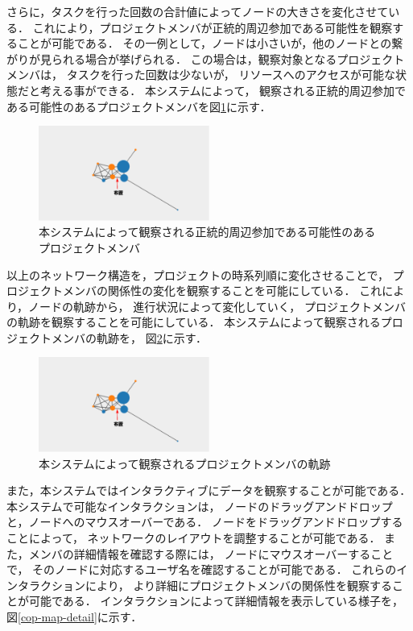 \documentclass[submit,techrep]{ipsj}
\begin{document}
さらに，タスクを行った回数の合計値によってノードの大きさを変化させている．
これにより，プロジェクトメンバが正統的周辺参加である可能性を観察することが可能である．
その一例として，ノードは小さいが，他のノードとの繋がりが見られる場合が挙げられる．
この場合は，観察対象となるプロジェクトメンバは，
タスクを行った回数は少ないが，
リソースへのアクセスが可能な状態だと考える事ができる．
本システムによって，
観察される正統的周辺参加である可能性のあるプロジェクトメンバを図\ref{cop-map-lpp}に示す．

\begin{figure}[h]
  \centering
  \includegraphics[width=0.5\textwidth]{img/cop-map-lpp.eps}
  \caption{本システムによって観察される正統的周辺参加である可能性のあるプロジェクトメンバ}
  \label{cop-map-lpp}
\end{figure}

以上のネットワーク構造を，プロジェクトの時系列順に変化させることで，
プロジェクトメンバの関係性の変化を観察することを可能にしている．
これにより，ノードの軌跡から，
進行状況によって変化していく，
プロジェクトメンバの軌跡を観察することを可能にしている．
本システムによって観察されるプロジェクトメンバの軌跡を，
図\ref{cop-map-trajectory}に示す．

\begin{figure}[h]
  \centering
  \includegraphics[width=0.5\textwidth]{img/cop-map-trajectory.eps}
  \caption{本システムによって観察されるプロジェクトメンバの軌跡}
  \label{cop-map-trajectory}
\end{figure}

また，本システムではインタラクティブにデータを観察することが可能である．
本システムで可能なインタラクションは，
ノードのドラッグアンドドロップと，ノードへのマウスオーバーである．
ノードをドラッグアンドドロップすることによって，
ネットワークのレイアウトを調整することが可能である．
また，メンバの詳細情報を確認する際には，
ノードにマウスオーバーすることで，
そのノードに対応するユーザ名を確認することが可能である．
これらのインタラクションにより，
より詳細にプロジェクトメンバの関係性を観察することが可能である．
インタラクションによって詳細情報を表示している様子を，
図\ref{cop-map-detail}に示す．
\end{document}
